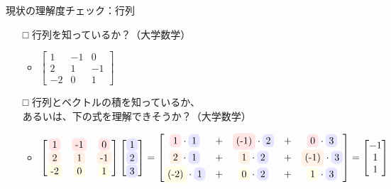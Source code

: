 \documentclass[dvipdfmx,aspectratio=169]{beamer}
\newcommand{\highlight}[2][yellow]{\tikz[baseline=(x.base)]{\node[rectangle,rounded corners,fill=#1!10](x){#2};}}
\begin{document}
	\begin{frame}{現状の理解度チェック：行列}
		\begin{itemize}
			\item[□]
				行列を知っているか？（大学数学）
				\begin{itemize}
					\item
						$ \begin{bmatrix}
							1 & -1 & 0\\
							2 & 1 & -1\\
							-2 & 0 & 1
						\end{bmatrix} $
				\end{itemize}
			\item[□]
				行列とベクトルの積を知っているか、\\
				あるいは、下の式を理解できそうか？（大学数学）
				\begin{itemize}
					\item
						$ \begin{bmatrix}
							\highlight[red]{1} & \highlight[red]{-1} & \highlight[red]{0}\\
							\highlight[orange]{2} & \highlight[orange]{1} & \highlight[orange]{-1}\\
							\highlight[yellow]{-2} & \highlight[yellow]{0} & \highlight[yellow]{1}
						\end{bmatrix} \begin{bmatrix}
							\highlight[blue]{1}\\ \highlight[blue]{2}\\ \highlight[blue]{3}
						\end{bmatrix}  = \begin{bmatrix}
							\highlight[red]{1}\cdot\highlight[blue]{1} &+& \highlight[red]{(-1)}\cdot\highlight[blue]{2} &+& \highlight[red]{0}\cdot\highlight[blue]{3}\\
							\highlight[orange]{2}\cdot\highlight[blue]{1} &+& \highlight[orange]{1}\cdot\highlight[blue]{2} &+& \highlight[orange]{(-1)}\cdot\highlight[blue]{3}\\
							\highlight[yellow]{(-2)}\cdot\highlight[blue]{1} &+& \highlight[yellow]{0}\cdot\highlight[blue]{2} &+& \highlight[yellow]{1}\cdot\highlight[blue]{3}
						\end{bmatrix} = \begin{bmatrix}
							-1\\ 1\\ 1
						\end{bmatrix}$
				\end{itemize}
		\end{itemize}
	\end{frame}
\end{document}
